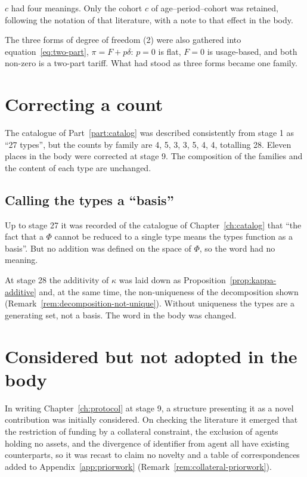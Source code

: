 $c$ had four meanings. Only the cohort $c$ of age--period--cohort was retained, following the
notation of that literature, with a note to that effect in the body.

The three forms of degree of freedom (2) were also gathered into
equation~\eqref{eq:two-part}, $\pi=F+p\delta$: $p=0$ is flat, $F=0$ is usage-based, and both
non-zero is a two-part tariff. What had stood as three forms became one family.

\section{Correcting a count}

The catalogue of Part~\ref{part:catalog} was described consistently from stage 1 as ``27 types'',
but the counts by family are 4, 5, 3, 3, 5, 4, 4, totalling 28. Eleven places in the body were
corrected at stage 9. The composition of the families and the content of each type are unchanged.

\subsection{Calling the types a ``basis''}
\label{sec:rev-basis}

Up to stage 27 it was recorded of the catalogue of Chapter~\ref{ch:catalog} that ``the fact that a
$\Phi$ cannot be reduced to a single type means the types function as a basis''. But no addition
was defined on the space of $\Phi$, so the word had no meaning.

At stage 28 the additivity of $\kappa$ was laid down as
Proposition~\ref{prop:kappa-additive} and, at the same time, the non-uniqueness of the
decomposition shown (Remark~\ref{rem:decomposition-not-unique}). Without uniqueness the types are a
generating set, not a basis. The word in the body was changed.

\section{Considered but not adopted in the body}

In writing Chapter~\ref{ch:protocol} at stage 9, a structure presenting it as a novel contribution
was initially considered. On checking the literature it emerged that the restriction of funding by
a collateral constraint, the exclusion of agents holding no assets, and the divergence of
identifier from agent all have existing counterparts, so it was recast to claim no novelty and a
table of correspondences added to Appendix~\ref{app:priorwork}
(Remark~\ref{rem:collateral-priorwork}).

